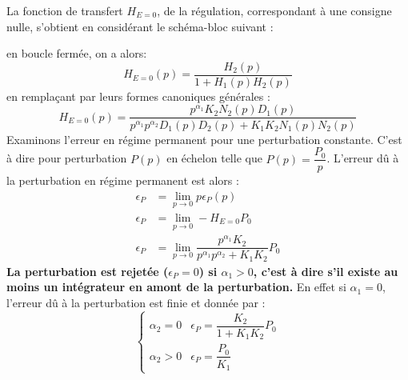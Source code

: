 La fonction de transfert $H_{E=0}$, de la régulation, correspondant à une 
consigne nulle, s'obtient en considérant le schéma-bloc suivant :
\begin{center}                                                  
    
\end{center}                                                    
\newcommand{\pau}{p^{\alpha_1}}
\newcommand{\pad}{p^{\alpha_2}}
en boucle fermée, on a alors:
\[
H_{E=0}(p)=\dfrac{H_2(p)}{1+H_1(p)H_2(p)}
\]
en remplaçant par leurs formes canoniques générales :
\[
H_{E=0}(p)=
\dfrac{\pau K_2N_2(p)D_1(p)}{\pau\pad D_1(p)D_2(p)+K_1K_2N_1(p)N_2(p)}
\]
Examinons l'erreur en régime permanent pour une perturbation constante.
C'est à dire pour perturbation $P(p)$ en échelon telle que 
$P(p)=\dfrac{P_0}{p}$. L'erreur dû à la perturbation en régime permanent 
est alors :
\begin{align*}
    \epsilon_P&=\lim\limits_{p\to0} p\epsilon_P(p)\\
    \epsilon_P&=\lim\limits_{p\to0} -H_{E=0}P_0\\
    \epsilon_P&=\lim\limits_{p\to0}\dfrac{\pau K_2}{\pau\pad+K_1K_2}P_0
\end{align*}
\textbf{La perturbation est rejetée ($\epsilon_P=0$) si $\alpha_1>0$, 
c'est à dire s'il existe au moins un intégrateur en amont de la perturbation.}
En effet si $\alpha_1=0$, l'erreur dû à la perturbation est finie et 
donnée par :
\[
    \begin{cases}
        \alpha_2=0 & \epsilon_P=\dfrac{K_2}{1+K_1K_2}P_0 \\[1.5em]
        \alpha_2>0 & \epsilon_P=\dfrac{P_0}{K_1}
    \end{cases}
\]
